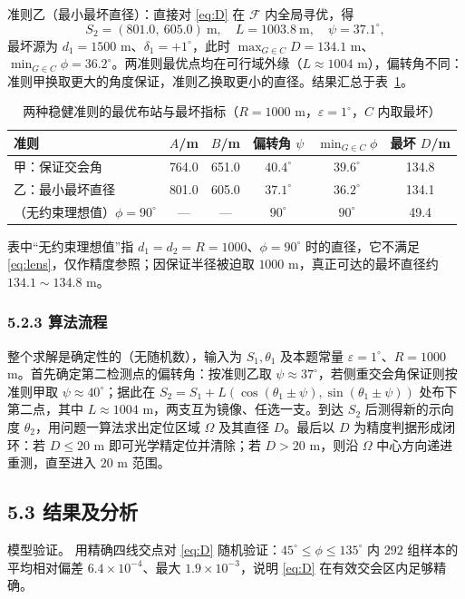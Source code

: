 \documentclass[UTF8, zihao=5,AutoFakeBold=2]{ctexart}
\begin{document}
		准则乙（最小最坏直径）：直接对 \eqref{eq:D} 在 \(\mathcal F\) 内全局寻优，得
		\begin{equation}
			S_2=(801.0,\ 605.0)\ \text{m},\quad L=1003.8\ \text{m},\quad \psi=37.1^\circ,
			\label{eq:criterionB}
		\end{equation}
		最坏源为 \(d_1=1500\) m、\(\delta_1=+1^\circ\)，此时 \(\max_{G\in C}D=134.1\) m、\(\min_{G\in C}\phi=36.2^\circ\)。两准则最优点均在可行域外缘（\(L\approx1004\) m），偏转角不同：准则甲换取更大的角度保证，准则乙换取更小的直径。结果汇总于表~\ref{tab:p2-plan}。

		\begin{table}[H]
			\centering
			\caption{两种稳健准则的最优布站与最坏指标（\(R=1000\) m，\(\varepsilon=1^\circ\)，\(C\) 内取最坏）}
			\label{tab:p2-plan}
			\begin{tabular}{lccccc}
				\toprule
				准则 & \(A\)/m & \(B\)/m & 偏转角 \(\psi\) & \(\min_{G\in C}\phi\) & 最坏 \(D\)/m \\
				\midrule
				甲：保证交会角 & 764.0 & 651.0 & \(40.4^\circ\) & \(39.6^\circ\) & 134.8 \\
				乙：最小最坏直径 & 801.0 & 605.0 & \(37.1^\circ\) & \(36.2^\circ\) & 134.1 \\
				（无约束理想值）\(\phi=90^\circ\) & --- & --- & \(90^\circ\) & \(90^\circ\) & 49.4 \\
				\bottomrule
			\end{tabular}
		\end{table}
		表中“无约束理想值”指 \(d_1=d_2=R=1000\)、\(\phi=90^\circ\) 时的直径，它不满足 \eqref{eq:lens}，仅作精度参照；因保证半径被迫取 \(1000\) m，真正可达的最坏直径约 \(134.1\sim134.8\) m。

		\subsubsection*{5.2.3 算法流程}
		整个求解是确定性的（无随机数），输入为 \(S_1,\theta_1\) 及本题常量 \(\varepsilon=1^\circ\)、\(R=1000\) m。首先确定第二检测点的偏转角：按准则乙取 \(\psi\approx37^\circ\)，若侧重交会角保证则按准则甲取 \(\psi\approx40^\circ\)；据此在 \(S_2=S_1+L(\cos(\theta_1\pm\psi),\sin(\theta_1\pm\psi))\) 处布下第二点，其中 \(L\approx1004\) m，两支互为镜像、任选一支。到达 \(S_2\) 后测得新的示向度 \(\theta_2\)，用问题一算法求出定位区域 \(\Omega\) 及其直径 \(D\)。最后以 \(D\) 为精度判据形成闭环：若 \(D\le20\) m 即可光学精定位并清除；若 \(D>20\) m，则沿 \(\Omega\) 中心方向递进重测，直至进入 \(20\) m 范围。

	\subsection*{5.3 结果及分析}
		模型验证。 用精确四线交点对 \eqref{eq:D} 随机验证：\(45^\circ\le\phi\le135^\circ\) 内 \(292\) 组样本的平均相对偏差 \(6.4\times10^{-4}\)、最大 \(1.9\times10^{-3}\)，说明 \eqref{eq:D} 在有效交会区内足够精确。
\end{document}
